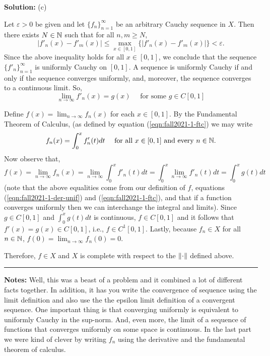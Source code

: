 \documentclass{article}
\begin{document}
\textbf{Solution:} (c)

Let $\varepsilon > 0$ be given and let $\{ f_n \}_{n=1}^\infty$ be an arbitrary Cauchy sequence in $X$. 
Then there exists $N\in \mathbb N$ such that for all $n,m\geq N$,
	\[ | f'_n(x) - f'_m(x) | \leq \max_{x\in [0,1]}\{| f'_n(x) - f'_m(x) |\} < \varepsilon. \]
Since the above inequality holds for all $x\in [0,1]$, we conclude that the sequence $\{ f'_n\}_{n=1}^\infty$ is uniformly
Cauchy on $[0,1]$. A sequence is uniformly Cauchy if and only if the sequence converges uniformly, and, moreover, 
the sequence converges to a continuous limit. So, 
	\begin{equation}\label{eqn:fall2021-1-der-unif}
		 \lim_{n\to \infty} f'_n(x) = g(x) \quad \text{ for some } g \in C[0,1]
	\end{equation}

Define $f(x) = \lim_{n\to\infty}f_n(x)$ for each $x\in[0,1]$. By the Fundamental Theorem of Calculus, (as defined by equation (\ref{eqn:fall2021-1-ftc}) we may write 
	\begin{equation*}
	 f_n(x) = \int_0^x f'_n(t) dt \quad \text{ for all } x\in [0,1] \text{ and every } n\in \mathbb N.
	 \end{equation*}
Now observe that,
	\[f(x) = \lim_{n \to \infty} f_n(x) = \lim_{n \to \infty} \int_0^x f'_n(t) dt = \int_0^x \lim_{n\to \infty} f'_n(t) dt = \int_0^x g(t) dt\]
(note that the above equalities come from our definition of $f$, equations (\ref{eqn:fall2021-1-der-unif}) and 
(\ref{eqn:fall2021-1-ftc}), and that if a function converges uniformly then we can interchange the integral and limits). 
Since $g\in C[0,1]$ and $\int_0^x g(t) dt$ is continuous, $f\in C[0,1]$ and it follows that $f'(x) = g(x) \in C[0,1]$, i.e.,
 $f\in C^1[0,1]$. Lastly, because $f_n\in X$ for all $n\in \mathbb N$, $f(0) = \lim_{n\to\infty} f_n(0) = 0$. 

Therefore, $f\in X$ and $X$ is complete with respect to the $\left\lVert {\cdot} \right\rVert$ defined above.\\

\hrule

\textbf{Notes:} Well, this was a beast of a problem and it combined a lot of different facts together. In addition, it has you write the convergence of sequence using the limit definition and also use the the epsilon limit definition of a convergent sequence. One important thing is that converging uniformly is equivalent to uniformly Cauchy in the sup-norm. And, even more, the limit of a sequence of functions that converges uniformly on some space is continuous. In the last part we were kind of clever by writing $f_n$ using the derivative and the fundamental theorem of calculus. 
\end{document}
